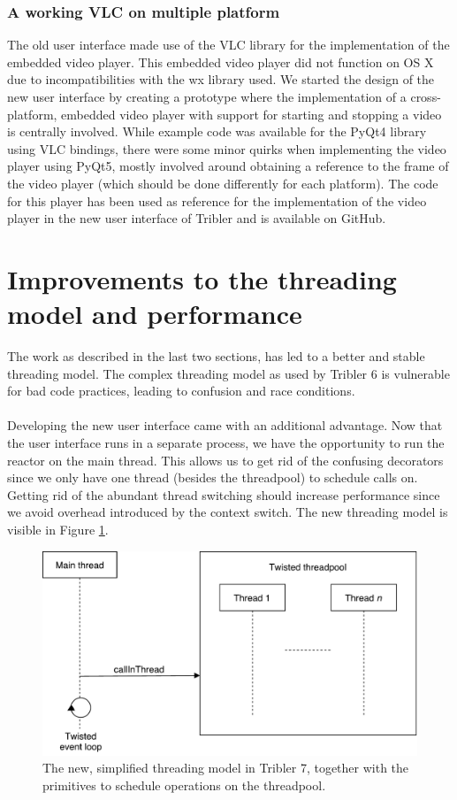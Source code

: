 \subsubsection{\textbf{A working VLC on multiple platform}}
The old user interface made use of the VLC library for the implementation of the embedded video player. This embedded video player did not function on OS X due to incompatibilities with the wx library used. We started the design of the new user interface by creating a prototype where the implementation of a cross-platform, embedded video player with support for starting and stopping a video is centrally involved. While example code was available for the PyQt4 library using VLC bindings, there were some minor quirks when implementing the video player using PyQt5, mostly involved around obtaining a reference to the frame of the video player (which should be done differently for each platform). The code for this player has been used as reference for the implementation of the video player in the new user interface of Tribler and is available on GitHub\cite{vos2016vlc}.

\section{Improvements to the threading model and performance}
The work as described in the last two sections, has led to a better and stable threading model. The complex threading model as used by Tribler 6 is vulnerable for bad code practices, leading to confusion and race conditions.\\\\
Developing the new user interface came with an additional advantage. Now that the user interface runs in a separate process, we have the opportunity to run the reactor on the main thread. This allows us to get rid of the confusing decorators since we only have one thread (besides the threadpool) to schedule calls on. Getting rid of the abundant thread switching should increase performance since we avoid overhead introduced by the context switch. The new threading model is visible in Figure \ref{fig:new-threading-model}.

\begin{figure}[h!]
	\centering
	\includegraphics[width=0.7\columnwidth]{images/improving_qa/new_threading_model_tribler}
	\caption{The new, simplified threading model in Tribler 7, together with the primitives to schedule operations on the threadpool.}
	\label{fig:new-threading-model}
\end{figure}

